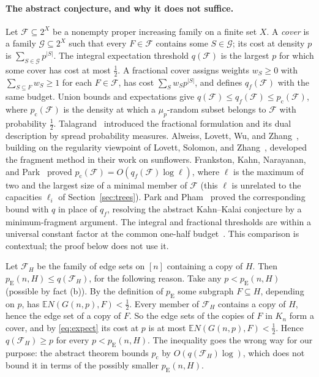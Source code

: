 \documentclass[11pt]{article}
\numberwithin{equation}{section}
\newcommand{\EE}{\mathbb E}
\newcommand{\pc}{p_{\mathrm c}}
\newcommand{\pE}{p_{\mathrm E}}
\begin{document}
\paragraph{The abstract conjecture, and why it does not suffice.}
Let $\mathcal F\subseteq2^X$ be a nonempty proper increasing family on
a finite set $X$. A \emph{cover} is a family $\mathcal G\subseteq2^X$
such that every $F\in\mathcal F$ contains some $S\in\mathcal G$; its
cost at density $p$ is $\sum_{S\in\mathcal G}p^{|S|}$. The integral
expectation threshold $q(\mathcal F)$ is the largest $p$ for which some
cover has cost at most $\frac12$. A fractional cover assigns weights
$w_S\ge0$ with $\sum_{S\subseteq F}w_S\ge1$ for each $F\in\mathcal F$,
has cost $\sum_Sw_Sp^{|S|}$, and defines $q_f(\mathcal F)$ with the
same budget. Union bounds and expectations give
$q(\mathcal F)\le q_f(\mathcal F)\le p_{\mathrm c}(\mathcal F)$, where
$p_{\mathrm c}(\mathcal F)$ is the density at which a $\mu_p$-random
subset belongs to $\mathcal F$ with probability $\frac12$.
Talagrand~\cite[Section~6]{Tal10} introduced the fractional formulation
and its dual description by spread probability measures. Alweiss,
Lovett, Wu, and Zhang~\cite{ALWZ21}, building on the regularity
viewpoint of Lovett, Solomon, and Zhang~\cite{LSZ19}, developed the
fragment method in their work on sunflowers. Frankston, Kahn,
Narayanan, and Park~\cite{FKNP21} proved
$p_{\mathrm c}(\mathcal F)=O(q_f(\mathcal F)\log\ell)$, where $\ell$ is
the maximum of two and the largest size of a minimal member of
$\mathcal F$ (this $\ell$ is unrelated to the capacities $\ell_i$ of
Section~\ref{sec:trees}). Park and Pham~\cite{PP24} proved the
corresponding bound with $q$ in place of $q_f$, resolving the abstract
Kahn--Kalai conjecture by a minimum-fragment argument. The integral and
fractional thresholds are within a universal constant factor at the
common one-half
budget~\cite[Theorem~1.1]{OpenAIThresholdEquivalence2026}. This
comparison is contextual; the proof below does not use it.

Let $\mathcal F_H$ be the family of edge sets on $[n]$ containing a copy
of $H$. Then $\pE(n,H)\le q(\mathcal F_H)$, for the following reason.
Take any $p<\pE(n,H)$ (possible by fact (b)). By the definition of
$\pE$ some subgraph $F\subseteq H$, depending on $p$, has
$\EE N(G(n,p),F)<\frac12$. Every member of $\mathcal F_H$ contains a copy
of $H$, hence the edge set of a copy of $F$. So the edge sets of the
copies of $F$ in $K_n$ form a cover, and by \eqref{eq:expect} its cost
at $p$ is at most $\EE N(G(n,p),F)<\frac12$. Hence
$q(\mathcal F_H)\ge p$ for every $p<\pE(n,H)$. The inequality goes the
wrong way for our purpose: the abstract theorem bounds $\pc$ by
$O(q(\mathcal F_H)\log)$, which does not bound it in terms of the
possibly smaller $\pE(n,H)$.
\end{document}
